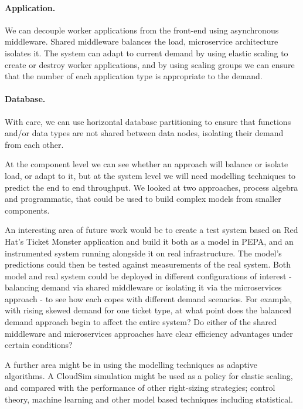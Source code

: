 \documentclass{llncs}
\begin{document}
\paragraph{Application.} We can decouple worker applications from the front-end using asynchronous middleware.  Shared middleware balances the load, microservice architecture isolates it.  The system can adapt to current demand by using elastic scaling to create or destroy worker applications, and by using scaling groups we can ensure that the number of each application type is appropriate to the demand.
\paragraph{Database.} With care, we can use horizontal database partitioning to ensure that functions and/or data types are not shared between data nodes, isolating their demand from each other.

At the component level we can see whether an approach will balance or isolate load, or adapt to it, but at the system level we will need modelling techniques to predict the end to end throughput.  We looked at two approaches, process algebra and programmatic, that could be used to build complex models from smaller components.

An interesting area of future work would be to create a test system based on Red Hat's Ticket Monster application \cite{redhatticketmonster} and build it both as a model in PEPA, and an instrumented system running alongside it on real infrastructure. The model's predictions could then be tested against measurements of the real system.  Both model and real system could be deployed in different configurations of interest - balancing demand via shared middleware or isolating it via the microservices approach - to see how each copes with different demand scenarios.  For example, with rising skewed demand for one ticket type, at what point does the balanced demand approach begin to affect the entire system?  Do either of the shared middleware and microservices approaches have clear efficiency advantages under certain conditions?

A further area might be in using the modelling techniques as adaptive algorithms.  A CloudSim simulation might be used as a policy for elastic scaling, and compared with the performance of other right-sizing strategies; control theory, machine learning and other model based techniques including statistical.

%
%



\end{document}
